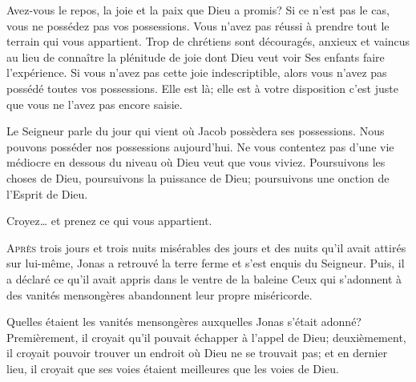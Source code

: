 
Avez-vous le repos, la joie et la paix que Dieu a promis?
 Si ce n'est pas le cas, vous ne possédez pas vos possessions.
 Vous n'avez pas réussi à prendre tout le terrain qui vous appartient.
 Trop de chrétiens sont découragés, anxieux et vaincus au lieu de connaître
 la plénitude de joie dont Dieu veut voir Ses enfants faire l'expérience.
 Si vous n'avez pas cette joie indescriptible, alors vous n'avez pas possédé
 toutes vos possessions. Elle est là; elle est à votre disposition
 \ocadr c'est juste que vous ne l'avez pas encore saisie. 

Le Seigneur parle du jour qui vient où Jacob possèdera ses possessions.
 Nous pouvons posséder nos possessions aujourd'hui.
 Ne vous contentez pas d'une vie médiocre en dessous du niveau
 où Dieu veut que vous viviez. Poursuivons les choses de Dieu,
 poursuivons la puissance de Dieu;
 poursuivons une onction de l'Esprit de Dieu. 

Croyez\dots{} et prenez ce qui vous appartient. 

\dvrule






\lettrine{A}{près} trois jours et trois nuits misérables
 \ocadr des jours et des nuits qu'il avait attirés sur lui-même,
 Jonas a retrouvé la terre ferme et s'est enquis du Seigneur.
 Puis, il a déclaré ce qu'il avait appris dans le ventre de la baleine\frcolon{}
 \Og Ceux qui s'adonnent à des vanités mensongères abandonnent
 leur propre miséricorde. \Fg{}  

Quelles étaient les vanités mensongères auxquelles Jonas s'était adonné?
 Premièrement, il croyait qu'il pouvait échapper à l'appel de Dieu;
 deuxièmement, il croyait pouvoir trouver un endroit où Dieu
 ne se trouvait pas; et en dernier lieu, il croyait que ses voies
 étaient meilleures que les voies de Dieu. 



